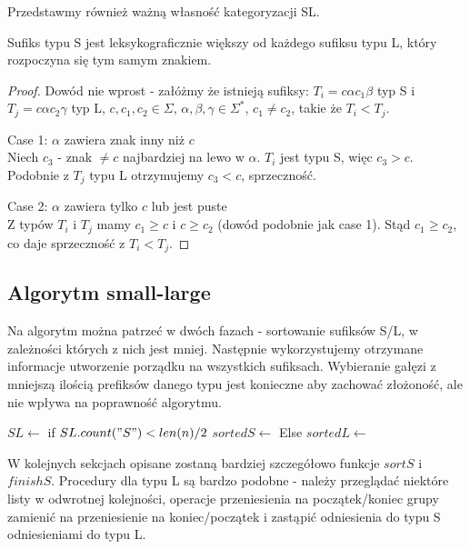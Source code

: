 Przedstawmy również ważną własność kategoryzacji SL.

\begin{lemma}{}{}
\label{SL_order}
Sufiks typu S jest leksykograficznie większy od każdego sufiksu typu L, który rozpoczyna się tym samym znakiem.
\end{lemma}
\begin{proof}
Dowód nie wprost - załóżmy że istnieją sufiksy: $T_i = c \alpha c_1 \beta$ typ S i $T_j = c\alpha c_2 \gamma$ typ L, $c, c_1, c_2 \in \Sigma$, $\alpha, \beta, \gamma \in \Sigma^*$, $c_1 \neq c_2$, takie że $T_i < T_j$.

\item[Case 1:] $\alpha$ zawiera znak inny niż $c$\\
Niech $c_3$ - znak $\neq c$ najbardziej na lewo w $\alpha$. $T_i$ jest typu S, więc $c_3>c$. Podobnie z $T_j$ typu L otrzymujemy $c_3<c$, sprzeczność.

\item[Case 2:] $\alpha$ zawiera tylko $c$ lub jest puste\\
Z typów $T_i$ i $T_j$ mamy $c_1 \geq c$ i $c \geq c_2$ (dowód podobnie jak case 1). Stąd $c_1 \geq c_2$, co daje sprzeczność z $T_i < T_j$.

\end{proof}

\subsection{Algorytm small-large}

Na algorytm można patrzeć w dwóch fazach - sortowanie sufiksów S/L, w zależności których z nich jest mniej. Następnie wykorzystujemy otrzymane informacje utworzenie porządku na wszystkich sufiksach. Wybieranie gałęzi z mniejszą ilością prefiksów danego typu jest konieczne aby zachować złożoność, ale nie wpływa na poprawność algorytmu.

\begin{algorithmic}
\State $SL \gets$ 
\State if $SL.count("S") < len(n)/2$
	\State $sortedS \gets$ 
	\State \Return {}
\State Else
	\State $sortedL \gets$ 
	\State \Return {}
\EndProcedure
\end{algorithmic}

W kolejnych sekcjach opisane zostaną bardziej szczegółowo funkcje $sortS$ i $finishS$. Procedury dla typu L są bardzo podobne - należy przeglądać niektóre listy w odwrotnej kolejności, operacje przeniesienia na początek/koniec grupy zamienić na przeniesienie na koniec/początek i zastąpić odniesienia do typu S odniesieniami do typu L.


